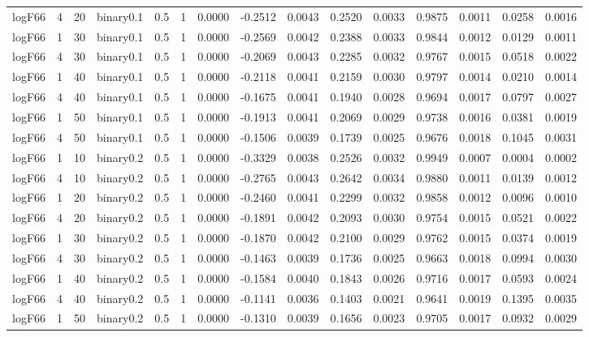 \begin{longtable}{rrrrrrrrrrrrrrr}
  logF66 & 4 & 20 & binary0.1 & 0.5 & 1 & 0.0000 & -0.2512 & 0.0043 & 0.2520 & 0.0033 & 0.9875 & 0.0011 & 0.0258 & 0.0016 \\ 
  logF66 & 1 & 30 & binary0.1 & 0.5 & 1 & 0.0000 & -0.2569 & 0.0042 & 0.2388 & 0.0033 & 0.9844 & 0.0012 & 0.0129 & 0.0011 \\ 
  logF66 & 4 & 30 & binary0.1 & 0.5 & 1 & 0.0000 & -0.2069 & 0.0043 & 0.2285 & 0.0032 & 0.9767 & 0.0015 & 0.0518 & 0.0022 \\ 
  logF66 & 1 & 40 & binary0.1 & 0.5 & 1 & 0.0000 & -0.2118 & 0.0041 & 0.2159 & 0.0030 & 0.9797 & 0.0014 & 0.0210 & 0.0014 \\ 
  logF66 & 4 & 40 & binary0.1 & 0.5 & 1 & 0.0000 & -0.1675 & 0.0041 & 0.1940 & 0.0028 & 0.9694 & 0.0017 & 0.0797 & 0.0027 \\ 
  logF66 & 1 & 50 & binary0.1 & 0.5 & 1 & 0.0000 & -0.1913 & 0.0041 & 0.2069 & 0.0029 & 0.9738 & 0.0016 & 0.0381 & 0.0019 \\ 
  logF66 & 4 & 50 & binary0.1 & 0.5 & 1 & 0.0000 & -0.1506 & 0.0039 & 0.1739 & 0.0025 & 0.9676 & 0.0018 & 0.1045 & 0.0031 \\ 
  logF66 & 1 & 10 & binary0.2 & 0.5 & 1 & 0.0000 & -0.3329 & 0.0038 & 0.2526 & 0.0032 & 0.9949 & 0.0007 & 0.0004 & 0.0002 \\ 
  logF66 & 4 & 10 & binary0.2 & 0.5 & 1 & 0.0000 & -0.2765 & 0.0043 & 0.2642 & 0.0034 & 0.9880 & 0.0011 & 0.0139 & 0.0012 \\ 
  logF66 & 1 & 20 & binary0.2 & 0.5 & 1 & 0.0000 & -0.2460 & 0.0041 & 0.2299 & 0.0032 & 0.9858 & 0.0012 & 0.0096 & 0.0010 \\ 
  logF66 & 4 & 20 & binary0.2 & 0.5 & 1 & 0.0000 & -0.1891 & 0.0042 & 0.2093 & 0.0030 & 0.9754 & 0.0015 & 0.0521 & 0.0022 \\ 
  logF66 & 1 & 30 & binary0.2 & 0.5 & 1 & 0.0000 & -0.1870 & 0.0042 & 0.2100 & 0.0029 & 0.9762 & 0.0015 & 0.0374 & 0.0019 \\ 
  logF66 & 4 & 30 & binary0.2 & 0.5 & 1 & 0.0000 & -0.1463 & 0.0039 & 0.1736 & 0.0025 & 0.9663 & 0.0018 & 0.0994 & 0.0030 \\ 
  logF66 & 1 & 40 & binary0.2 & 0.5 & 1 & 0.0000 & -0.1584 & 0.0040 & 0.1843 & 0.0026 & 0.9716 & 0.0017 & 0.0593 & 0.0024 \\ 
  logF66 & 4 & 40 & binary0.2 & 0.5 & 1 & 0.0000 & -0.1141 & 0.0036 & 0.1403 & 0.0021 & 0.9641 & 0.0019 & 0.1395 & 0.0035 \\ 
  logF66 & 1 & 50 & binary0.2 & 0.5 & 1 & 0.0000 & -0.1310 & 0.0039 & 0.1656 & 0.0023 & 0.9705 & 0.0017 & 0.0932 & 0.0029 \\ 

\end{longtable}
